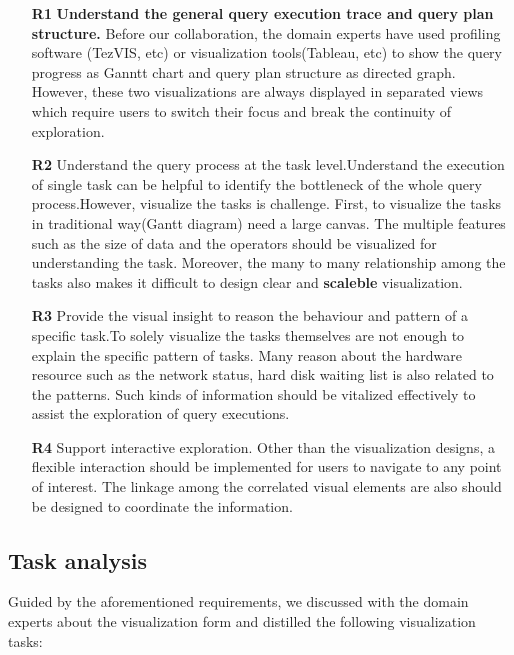 \begin{itemize}
  \item[\textbf{R1}]\textbf{Understand the general query execution trace and query plan structure.} Before our collaboration, the domain experts have used profiling software (TezVIS, etc) or visualization tools(Tableau, etc) to show the query progress as Ganntt chart and query plan structure as directed graph. However, these two visualizations are always displayed in separated views which require users to switch their focus and break the continuity of exploration.
  \item[\textbf{R2}]{Understand the query process at the task level.}Understand the execution of single task can be helpful to identify the bottleneck of the whole query process.However, visualize the tasks is challenge. First, to visualize the tasks in traditional way(Gantt diagram) need a large canvas. The multiple features such as the size of data and the operators should be visualized for understanding the task. Moreover, the many to many relationship among the tasks also makes it difficult to design clear and \textbf{scaleble} visualization.
  \item[\textbf{R3}]{Provide the visual insight to reason the behaviour and pattern of a specific task.}To solely visualize the tasks themselves are not enough to explain the specific pattern of tasks. Many reason about the hardware resource such as the network status, hard disk waiting list is also related to the patterns. Such kinds of information should be vitalized effectively to assist the exploration of query executions. 
  \item[\textbf{R4}]{ Support interactive exploration.} Other than the visualization designs, a flexible interaction should be implemented for users to navigate to any point of interest. The linkage among the correlated visual elements are also should be designed to coordinate the information.

\end{itemize}

\subsection{Task analysis}
Guided by the aforementioned requirements, we discussed with the domain experts about the visualization form and distilled the following visualization tasks:

